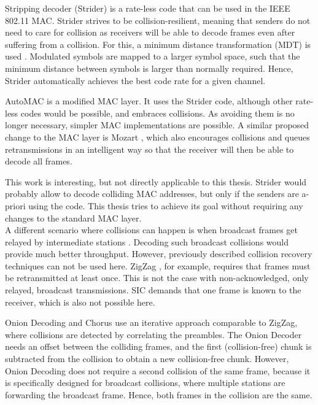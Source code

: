 Stripping decoder (Strider) \cite{gudipati2011} is a rate-less code that can be used in the IEEE 802.11 \gls{MAC}. Strider strives to be collision-resilient, meaning that senders do not need to care for collision as receivers will be able to decode frames even after suffering from a collision. For this, a minimum distance transformation (MDT) is used \cite{gudipati2011}. Modulated symbols are mapped to a larger symbol space, such that the minimum distance between symbols is larger than normally required. Hence, Strider automatically achieves the best code rate for a given channel.

AutoMAC \cite{gudipati2012} is a modified \gls{MAC} layer. It uses the Strider code, although other rate-less codes would be possible, and embraces collisions. As avoiding them is no longer necessary, simpler \gls{MAC} implementations are possible. A similar proposed change to the \gls{MAC} layer is Mozart \cite{bansal2013}, which also encourages collisions and queues retransmissions in an intelligent way so that the receiver will then be able to decode all frames.

This work is interesting, but not directly applicable to this thesis. Strider would probably allow to decode colliding \gls{MAC} addresses, but only if the senders are a-priori using the code. This thesis tries to achieve its goal without requiring any changes to the standard \gls{MAC} layer.\\

A different scenario where collisions can happen is when broadcast frames get relayed by intermediate stations \cite{hejazi2010}. Decoding  such broadcast collisions would provide much better throughput. However, previously described collision recovery techniques can not be used here. ZigZag \cite{gollakota2008}, for example, requires that frames must be retransmitted at least once. This is not the case with non-acknowledged, only relayed, broadcast transmissions. \gls{SIC} \cite{patel1994} demands that one frame is known to the receiver, which is also not possible here.

Onion Decoding \cite{wang2010} and Chorus \cite{zhang2010} use an iterative approach comparable to ZigZag, where collisions are detected by correlating the preambles. The Onion Decoder needs an offset between the colliding frames, and the first (collision-free) chunk is subtracted from the collision to obtain a new collision-free chunk. However, Onion Decoding does not require a second collision of the same frame, because it is specifically designed for broadcast collisions, where multiple stations are forwarding the broadcast frame. Hence, both frames in the collision are the same.

